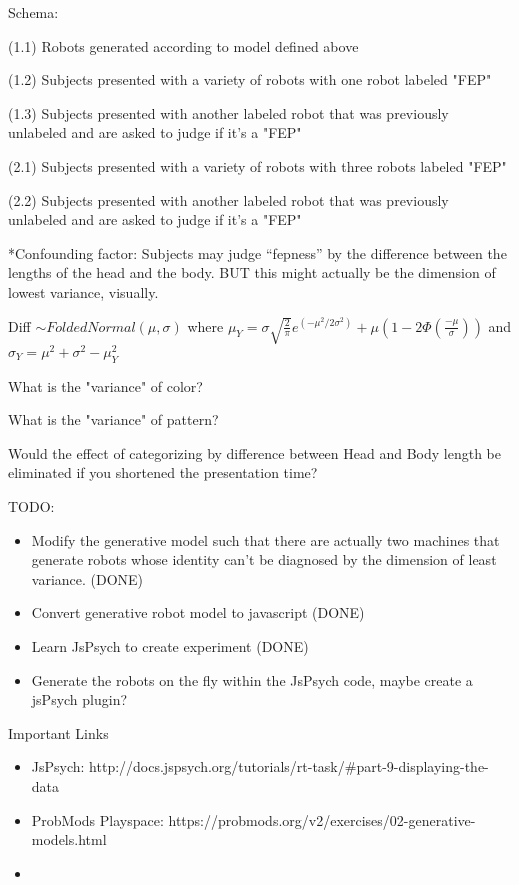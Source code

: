 \documentclass[12pt]{article}
\begin{document}
\noindent Schema: 

\noindent (1.1) Robots generated according to model defined above

\noindent (1.2) Subjects presented with a variety of robots with one robot labeled "FEP"

\noindent (1.3) Subjects presented with another labeled robot that was previously unlabeled and are asked to judge if it's a "FEP"

\noindent (2.1) Subjects presented with a variety of robots with three robots labeled "FEP"

\noindent (2.2) Subjects presented with another labeled robot that was previously unlabeled and are asked to judge if it's a "FEP"

\vspace{0.2in}

\noindent **Confounding factor: Subjects may judge ``fepness'' by the difference between the lengths of the head and the body. BUT this might actually be the dimension of lowest variance, visually.

\vspace{0.2in}

\noindent Diff $\sim FoldedNormal(\mu,\sigma)$ where $\mu_Y = \sigma \sqrt{\frac{2}{\pi}}e^{(-\mu^2/2\sigma^2)} + \mu (1-2\Phi(\frac{-\mu}{\sigma}))$ and $\sigma_Y = \mu^2 + \sigma^2 - \mu_Y ^2$

\noindent What is the "variance" of color?

\noindent What is the "variance" of pattern?

\noindent Would the effect of categorizing by difference between Head and Body length be eliminated if you shortened the presentation time?

\vspace{0.5in}

\noindent TODO:
\begin{itemize}
	\item Modify the generative model such that there are actually two machines that generate robots whose identity can't be diagnosed by the dimension of least variance. (DONE)
	\item Convert generative robot model to javascript (DONE)
	\item Learn JsPsych to create experiment (DONE)
	\item Generate the robots on the fly within the JsPsych code, maybe create a jsPsych plugin?
\end{itemize}

\vspace{0.5in}
\noindent Important Links
\begin{itemize}
	\item JsPsych: http://docs.jspsych.org/tutorials/rt-task/\#part-9-displaying-the-data
	\item ProbMods Playspace: https://probmods.org/v2/exercises/02-generative-models.html
	\item 
\end{itemize}
\end{document}
